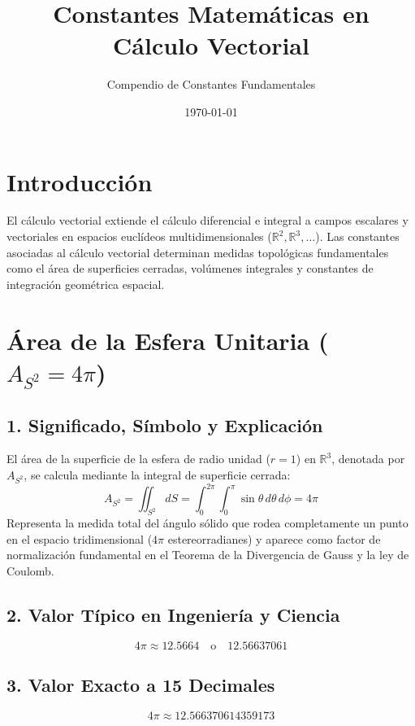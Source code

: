 \documentclass[12pt,a4paper]{article}
\title{\textbf{Constantes Matemáticas en Cálculo Vectorial}}
\author{Compendio de Constantes Fundamentales}
\date{\today}
\begin{document}
\maketitle

\section*{Introducción}
El cálculo vectorial extiende el cálculo diferencial e integral a campos escalares y vectoriales en espacios euclídeos multidimensionales ($\mathbb{R}^2, \mathbb{R}^3, \dots$). Las constantes asociadas al cálculo vectorial determinan medidas topológicas fundamentales como el área de superficies cerradas, volúmenes integrales y constantes de integración geométrica espacial.

\section{Área de la Esfera Unitaria ($A_{S^2} = 4\pi$)}

\subsection*{1. Significado, Símbolo y Explicación}
El área de la superficie de la esfera de radio unidad ($r=1$) en $\mathbb{R}^3$, denotada por $A_{S^2}$, se calcula mediante la integral de superficie cerrada:
\begin{equation*}
A_{S^2} = \iint_{S^2} dS = \int_{0}^{2\pi} \int_{0}^{\pi} \sin\theta \, d\theta \, d\phi = 4\pi
\end{equation*}
Representa la medida total del ángulo sólido que rodea completamente un punto en el espacio tridimensional ($4\pi$ estereorradianes) y aparece como factor de normalización fundamental en el Teorema de la Divergencia de Gauss y la ley de Coulomb.

\subsection*{2. Valor Típico en Ingeniería y Ciencia}
\begin{equation*}
4\pi \approx 12.5664 \quad \text{o} \quad 12.56637061
\end{equation*}

\subsection*{3. Valor Exacto a 15 Decimales}
\begin{equation*}
4\pi \approx 12.566370614359173
\end{equation*}
\end{document}

